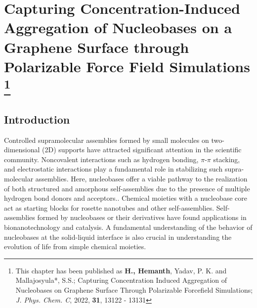 \chapter[Capturing Concentration-Induced Aggregation of Nucleobases on a Graphene Surface through Polarizable Force Field Simulations]{Capturing Concentration-Induced Aggregation of Nucleobases on a Graphene Surface through Polarizable Force Field Simulations \protect\footnote[3]{This chapter has been published as \textbf{H., Hemanth}, Yadav, P. K. and Mallajosyula*, S.S.; Capturing Concentration Induced Aggregation of Nucleobases on Graphene Surface Through Polarizable Forcefield Simulations; {\textit{J. Phys. Chem. C}, 2022, \textbf{31}, 13122 - 13131}}}
\section{Introduction}
Controlled supramolecular assemblies formed by small molecules on two-dimensional (2D) supports have attracted significant attention in the scientific community.\supercite{goronzy_supramolecular_2018, moradi_two-dimensional_2017,quesne-turin_first-principles_2017} Noncovalent interactions such as hydrogen bonding, $\pi$-$\pi$ stacking, and electrostatic interactions play a fundamental role in stabilizing such supra-molecular assemblies.\supercite{subramani_self-assembly_2012} Here, nucleobases offer a viable pathway to the realization of both structured and amorphous self-assemblies due to the presence of multiple hydrogen bond donors and acceptors.\supercite{saravanan_surface_2018, saikia_hierarchical_2017, freund_structure_1997, heckl_two-dimensional_1991, saikia_dynamics_2018, kelly_understanding_2008, lukas_adenine_2009, wandlowski_structure_1996, otero_elementary_2008}. Chemical moieties with a nucleobase core act as starting blocks for rosette nanotubes\supercite{marsh_self-complementary_1996, fenniri_helical_2001} and other self-assemblies.\supercite{lafitte_quadruply_2006, park_highly_2005, sessler_novel_2003} Self-assemblies formed by nucleobases or their derivatives have found applications in bionanotechnology\supercite{laguerre_synthetic_2015, suri_role_2009, song_self-assembled_2011} and catalysis.\supercite{chhabra_electroless_2011, borzsonyi_water-soluble_2010} A fundamental understanding of the behavior of nucleobases at the solid-liquid interface is also crucial in understanding the evolution of life from simple chemical moieties.\supercite{cassidy_guanine-centric_2014, sowerby_role_1998}

